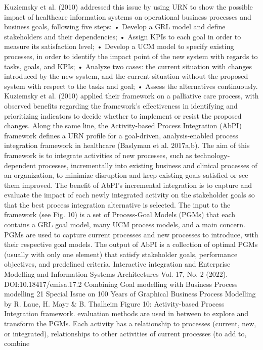 Kuziemsky et al. (2010) addressed this issue
by using URN to show the possible impact of
healthcare information systems on operational
business processes and business goals, following
five steps:
• Develop a GRL model and define stakeholders
and their dependencies;
• Assign KPIs to each goal in order to measure
its satisfaction level;
• Develop a UCM model to specify existing processes, in order to identify the impact point of
the new system with regards to tasks, goals, and
KPIs;
• Analyze two cases: the current situation with
changes introduced by the new system, and the
current situation without the proposed system
with respect to the tasks and goal;
• Assess the alternatives continuously.
Kuziemsky et al. (2010) applied their framework
on a palliative care process, with observed benefits
regarding the framework’s effectiveness in identifying and prioritizing indicators to decide whether
to implement or resist the proposed changes.
Along the same line, the Activity-based Process Integration (AbPI) framework defines a URN
profile for a goal-driven, analysis-enabled process
integration framework in healthcare (Baslyman
et al. 2017a,b). The aim of this framework is
to integrate activities of new processes, such as
technology-dependent processes, incrementally
into existing business and clinical processes of
an organization, to minimize disruption and keep
existing goals satisfied or see them improved.
The benefit of AbPI’s incremental integration
is to capture and evaluate the impact of each newly
integrated activity on the stakeholder goals so that
the best process integration alternative is selected.
The input to the framework (see Fig. 10) is a
set of Process-Goal Models (PGMs) that each
contains a GRL goal model, many UCM process
models, and a main concern. PGMs are used
to capture current processes and new processes
to introduce, with their respective goal models.
The output of AbPI is a collection of optimal
PGMs (usually with only one element) that satisfy
stakeholder goals, performance objectives, and
predefined criteria. Interactive integration and
Enterprise Modelling and Information Systems Architectures
Vol. 17, No. 2 (2022). DOI:10.18417/emisa.17.2
Combining Goal modelling with Business Process modelling 21
Special Issue on 100 Years of Graphical Business Process Modelling by R. Laue, H. Mayr & B. Thalheim
Figure 10: Activity-based Process Integration framework.
evaluation methods are used in between to explore
and transform the PGMs.
Each activity has a relationship to processes
(current, new, or integrated), relationships to other
activities of current processes (to add to, combine
